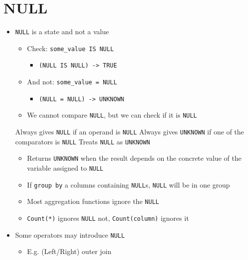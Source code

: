
\section{NULL}
\begin{itemize}
    \item \verb+NULL+ is a state and not a value
        \begin{itemize}
            \item Check: \verb+some_value IS NULL+
                \begin{itemize}
                    \item \verb+(NULL IS NULL) -> TRUE+
                \end{itemize}
            \item And not: \verb+some_value = NULL+
                \begin{itemize}
                    \item \verb+(NULL = NULL) -> UNKNOWN+
                \end{itemize}
            \item We cannot compare \verb+NULL+, but we can check if it is \verb+NULL+
        \end{itemize}
     Always gives \verb+NULL+ if an operand is \verb+NULL+
     Always gives \verb+UNKNOWN+ if one of the comparators is \verb+NULL+
     Treats \verb+NULL+ as \verb+UNKNOWN+
        \begin{itemize}
            \item Returns \verb+UNKNOWN+ when the result depends on the concrete value of the variable assigned to \verb+NULL+
        \end{itemize}
        \begin{itemize}
            \item If \verb+group by+ a columns containing \verb+NULL+s, \verb+NULL+ will be in one group
            \item Most aggregation functions ignore the \verb+NULL+
            \item \verb+Count(*)+ ignores \verb+NULL+ not, \verb+Count(column)+ ignores it
        \end{itemize}
    \item Some operators may introduce \verb+NULL+
        \begin{itemize}
            \item E.g. (Left/Right) outer join
        \end{itemize}
\end{itemize}
